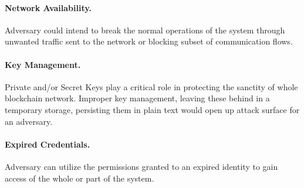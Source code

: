 \paragraph{Network Availability.}  Adversary could intend to break the normal operations of the system through unwanted traffic sent to the network or blocking subset of communication flows.

\paragraph{Key Management.}  Private and/or Secret Keys play a critical role in protecting the sanctity of whole blockchain network. Improper key management, leaving these behind in a temporary storage, persisting them in plain text would open up attack surface for an adversary.

\paragraph{Expired Credentials.}  Adversary can utilize the permissions granted to an expired identity to gain access of the whole or part of the system.